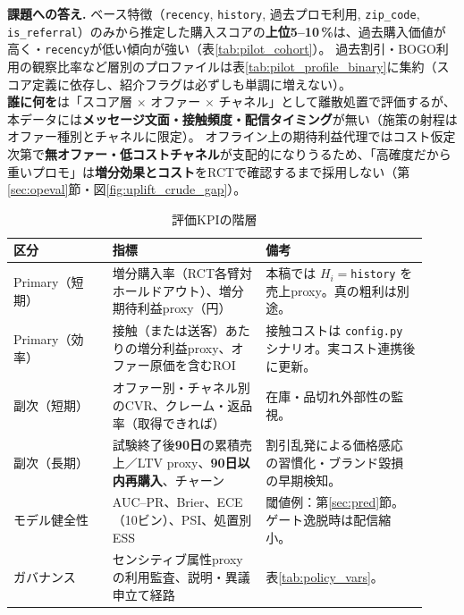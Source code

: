 \noindent\textbf{課題への答え.}
ベース特徴（\texttt{recency}, \texttt{history}, 過去プロモ利用, \texttt{zip\_code}, \texttt{is\_referral}）のみから推定した購入スコアの\textbf{上位5--10\,\%}は、過去購入価値が高く・\texttt{recency}が低い傾向が強い（表\ref{tab:pilot_cohort}）。
過去割引・BOGO利用の観察比率など層別のプロファイルは表\ref{tab:pilot_profile_binary}に集約（スコア定義に依存し、紹介フラグは必ずしも単調に増えない）。\\
\textbf{誰に何を}は「スコア層 $\times$ オファー $\times$ チャネル」として離散処置で評価するが、本データには\textbf{メッセージ文面・接触頻度・配信タイミング}が無い（施策の射程はオファー種別とチャネルに限定）。
オフライン上の期待利益代理ではコスト仮定次第で\textbf{無オファー・低コストチャネル}が支配的になりうるため、「高確度だから重いプロモ」は\textbf{増分効果とコスト}をRCTで確認するまで採用しない（第\ref{sec:opeval}節・図\ref{fig:uplift_crude_gap}）。


\FloatBarrier
\begin{table}[htbp]
  \centering
  \small
  \caption{評価KPIの階層}
  \label{tab:kpi_hierarchy}
  \begin{tabular}{@{}p{0.22\linewidth}p{0.34\linewidth}p{0.36\linewidth}@{}}
    \toprule
    区分 & 指標 & 備考 \\
    \midrule
    Primary（短期） &
    増分購入率（RCT各臂対ホールドアウト）、増分期待利益proxy（円） &
    本稿では $H_i{=}$\texttt{history} を売上proxy。真の粗利は別途。 \\
    Primary（効率） &
    接触（または送客）あたりの増分利益proxy、オファー原価を含むROI &
    接触コストは \texttt{config.py} シナリオ。実コスト連携後に更新。 \\
    副次（短期） &
    オファー別・チャネル別のCVR、クレーム・返品率（取得できれば） &
    在庫・品切れ外部性の監視。 \\
    副次（長期） &
    試験終了後\textbf{90日}の累積売上／LTV proxy、\textbf{90日以内再購入}、チャーン &
    割引乱発による価格感応の習慣化・ブランド毀損の早期検知。 \\
    モデル健全性 &
    AUC--PR、Brier、ECE（10ビン）、PSI、処置別ESS &
    閾値例：第\ref{sec:pred}節。ゲート逸脱時は配信縮小。 \\
    ガバナンス &
    センシティブ属性proxyの利用監査、説明・異議申立て経路 &
    表\ref{tab:policy_vars}。 \\
    \bottomrule
  \end{tabular}
\end{table}

